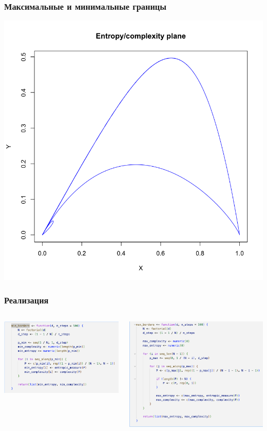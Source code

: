 \documentclass[aspectratio=169]{beamer}
\begin{document}
\begin{frame}
  \frametitle{Максимальные и минимальные границы}
  \medskip
  \begin{center}
    \includegraphics[width=0.5\columnwidth]{Plane.png}
  \end{center} 
\end{frame}

\begin{frame}
  \frametitle{Реализация}
  \medskip
  \begin{columns}
    \includegraphics[width=\columnwidth]{min_border.png}
    
    \includegraphics[width=\columnwidth]{max_border.png}
    \end{columns}
\end{frame}
\end{document}
